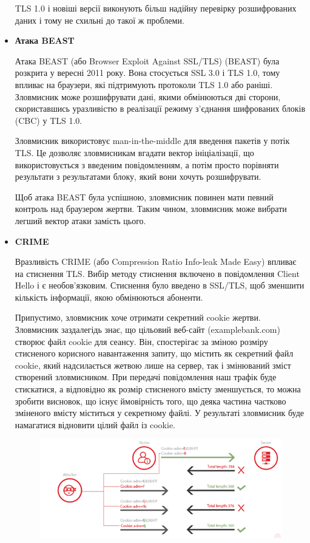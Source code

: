 \begin{itemize}
    
    TLS 1.0 і новіші версії виконують більш надійну перевірку розшифрованих даних і тому не схильні до такої ж проблеми.
    
    \item \textbf{Атака BEAST}

    Атака BEAST (або Browser Exploit Against SSL/TLS) (BEAST) була розкрита у вересні 2011 року. Вона стосується SSL 3.0 і TLS 1.0, тому впливає на браузери, які підтримують протоколи TLS 1.0 або раніші. Зловмисник може розшифрувати дані, якими обмінюються дві сторони, скориставшись уразливістю в реалізації режиму з’єднання шифрованих блоків (CBC) у TLS 1.0.


    Зловмисник використовує man-in-the-middle для введення пакетів у потік TLS. Це дозволяє зловмисникам вгадати вектор ініціалізації, що використовується з введеним повідомленням, а потім просто порівняти результати з результатами блоку, який вони хочуть розшифрувати.


    Щоб атака BEAST була успішною, зловмисник повинен мати певний контроль над браузером жертви. Таким чином, зловмисник може вибрати легший вектор атаки замість цього.
    
    
    
    \item \textbf{CRIME}

    Вразливість CRIME (або Compression Ratio Info-leak Made Easy) впливає на стиснення TLS. Вибір методу стиснення включено в повідомлення Client Hello і є необов’язковим. Стиснення було введено в SSL/TLS, щоб зменшити кількість інформації, якою обмінюються абоненти.


    Припустимо, зловмисник хоче отримати секретний cookie жертви. Зловмисник заздалегідь знає, що цільовий веб-сайт (examplebank.com) створює файл cookie для сеансу. Він, спостерігає за зміною розміру стисненого корисного навантаження запиту, що містить як секретний файл cookie, який надсилається жетвою лише на сервер, так і змінюваний зміст створений зловмисником. При передачі повідомлення наш трафік буде стискатися, а відповідно як розмір стисненого вмісту зменшується, то можна зробити висновок, що існує ймовірність того, що деяка частина частково зміненого вмісту міститься у секретному файлі. У результаті зловмисник буде намагатися відновити цілий файл із cookie.

    \begin{figure}[ht]
        \centering
        \includegraphics[scale=0.35]{../IMAGES/crime_2.png}
        \label{weak_keys_rc4}
    \end{figure}


\end{itemize}
